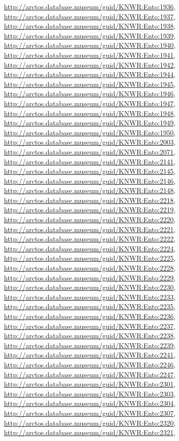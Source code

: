 \documentclass[9pt, article]{memoir}
\begin{document}
\begin{multicols}{2}
\url{http://arctos.database.museum/guid/KNWR:Ento:1936}, 
\url{http://arctos.database.museum/guid/KNWR:Ento:1937}, 
\url{http://arctos.database.museum/guid/KNWR:Ento:1938}, 
\url{http://arctos.database.museum/guid/KNWR:Ento:1939}, 
\url{http://arctos.database.museum/guid/KNWR:Ento:1940}, 
\url{http://arctos.database.museum/guid/KNWR:Ento:1941}, 
\url{http://arctos.database.museum/guid/KNWR:Ento:1942}, 
\url{http://arctos.database.museum/guid/KNWR:Ento:1944}, 
\url{http://arctos.database.museum/guid/KNWR:Ento:1945}, 
\url{http://arctos.database.museum/guid/KNWR:Ento:1946}, 
\url{http://arctos.database.museum/guid/KNWR:Ento:1947}, 
\url{http://arctos.database.museum/guid/KNWR:Ento:1948}, 
\url{http://arctos.database.museum/guid/KNWR:Ento:1949}, 
\url{http://arctos.database.museum/guid/KNWR:Ento:1950}, 
\url{http://arctos.database.museum/guid/KNWR:Ento:2003}, 
\url{http://arctos.database.museum/guid/KNWR:Ento:2071}, 
\url{http://arctos.database.museum/guid/KNWR:Ento:2141}, 
\url{http://arctos.database.museum/guid/KNWR:Ento:2145}, 
\url{http://arctos.database.museum/guid/KNWR:Ento:2146}, 
\url{http://arctos.database.museum/guid/KNWR:Ento:2148}, 
\url{http://arctos.database.museum/guid/KNWR:Ento:2218}, 
\url{http://arctos.database.museum/guid/KNWR:Ento:2219}, 
\url{http://arctos.database.museum/guid/KNWR:Ento:2220}, 
\url{http://arctos.database.museum/guid/KNWR:Ento:2221}, 
\url{http://arctos.database.museum/guid/KNWR:Ento:2222}, 
\url{http://arctos.database.museum/guid/KNWR:Ento:2224}, 
\url{http://arctos.database.museum/guid/KNWR:Ento:2225}, 
\url{http://arctos.database.museum/guid/KNWR:Ento:2228}, 
\url{http://arctos.database.museum/guid/KNWR:Ento:2229}, 
\url{http://arctos.database.museum/guid/KNWR:Ento:2230}, 
\url{http://arctos.database.museum/guid/KNWR:Ento:2233}, 
\url{http://arctos.database.museum/guid/KNWR:Ento:2235}, 
\url{http://arctos.database.museum/guid/KNWR:Ento:2236}, 
\url{http://arctos.database.museum/guid/KNWR:Ento:2237}, 
\url{http://arctos.database.museum/guid/KNWR:Ento:2238}, 
\url{http://arctos.database.museum/guid/KNWR:Ento:2239}, 
\url{http://arctos.database.museum/guid/KNWR:Ento:2241}, 
\url{http://arctos.database.museum/guid/KNWR:Ento:2246}, 
\url{http://arctos.database.museum/guid/KNWR:Ento:2247}, 
\url{http://arctos.database.museum/guid/KNWR:Ento:2301}, 
\url{http://arctos.database.museum/guid/KNWR:Ento:2303}, 
\url{http://arctos.database.museum/guid/KNWR:Ento:2304}, 
\url{http://arctos.database.museum/guid/KNWR:Ento:2307}, 
\url{http://arctos.database.museum/guid/KNWR:Ento:2320}, 
\url{http://arctos.database.museum/guid/KNWR:Ento:2321}, 

\end{multicols}
\end{document}
